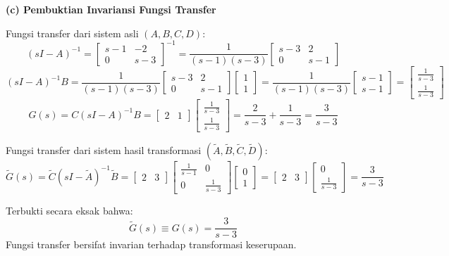 \documentclass[11pt,a4paper]{article}
\begin{document}
\textbf{(c) Pembuktian Invariansi Fungsi Transfer}

Fungsi transfer dari sistem asli $(A, B, C, D)$:
$$(sI - A)^{-1} = \begin{bmatrix} s-1 & -2 \\ 0 & s-3 \end{bmatrix}^{-1} = \frac{1}{(s-1)(s-3)} \begin{bmatrix} s-3 & 2 \\ 0 & s-1 \end{bmatrix}$$
$$(sI - A)^{-1} B = \frac{1}{(s-1)(s-3)} \begin{bmatrix} s-3 & 2 \\ 0 & s-1 \end{bmatrix} \begin{bmatrix} 1 \\ 1 \end{bmatrix} = \frac{1}{(s-1)(s-3)} \begin{bmatrix} s-1 \\ s-1 \end{bmatrix} = \begin{bmatrix} \frac{1}{s-3} \\ \frac{1}{s-3} \end{bmatrix}$$
$$G(s) = C (sI - A)^{-1} B = \begin{bmatrix} 2 & 1 \end{bmatrix} \begin{bmatrix} \frac{1}{s-3} \\ \frac{1}{s-3} \end{bmatrix} = \frac{2}{s-3} + \frac{1}{s-3} = \frac{3}{s-3}$$

Fungsi transfer dari sistem hasil transformasi $(\tilde{A}, \tilde{B}, \tilde{C}, \tilde{D})$:
$$\tilde{G}(s) = \tilde{C} (sI - \tilde{A})^{-1} \tilde{B} = \begin{bmatrix} 2 & 3 \end{bmatrix} \begin{bmatrix} \frac{1}{s-1} & 0 \\ 0 & \frac{1}{s-3} \end{bmatrix} \begin{bmatrix} 0 \\ 1 \end{bmatrix} = \begin{bmatrix} 2 & 3 \end{bmatrix} \begin{bmatrix} 0 \\ \frac{1}{s-3} \end{bmatrix} = \frac{3}{s-3}$$

Terbukti secara eksak bahwa:
$$\tilde{G}(s) \equiv G(s) = \frac{3}{s-3}$$
Fungsi transfer bersifat invarian terhadap transformasi keserupaan.
\end{document}

